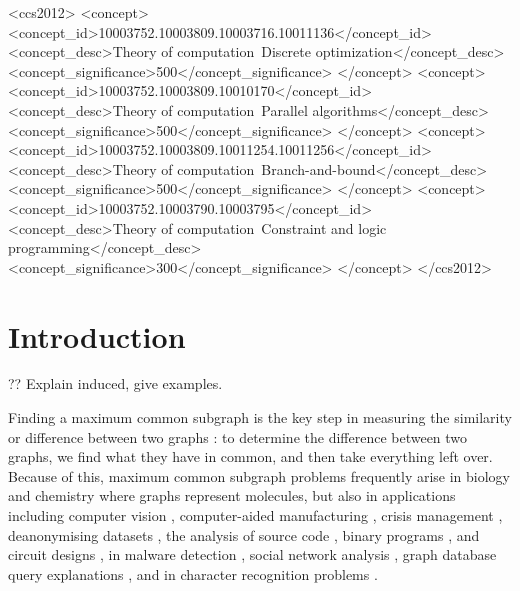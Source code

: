 \documentclass[sigconf]{acmart}
\begin{document}
\begin{CCSXML}
<ccs2012>
<concept>
<concept_id>10003752.10003809.10003716.10011136</concept_id>
<concept_desc>Theory of computation~Discrete optimization</concept_desc>
<concept_significance>500</concept_significance>
</concept>
<concept>
<concept_id>10003752.10003809.10010170</concept_id>
<concept_desc>Theory of computation~Parallel algorithms</concept_desc>
<concept_significance>500</concept_significance>
</concept>
<concept>
<concept_id>10003752.10003809.10011254.10011256</concept_id>
<concept_desc>Theory of computation~Branch-and-bound</concept_desc>
<concept_significance>500</concept_significance>
</concept>
<concept>
<concept_id>10003752.10003790.10003795</concept_id>
<concept_desc>Theory of computation~Constraint and logic programming</concept_desc>
<concept_significance>300</concept_significance>
</concept>
</ccs2012>
\end{CCSXML}



\maketitle

\section{Introduction}

?? Explain induced, give examples.

Finding a maximum common subgraph is the key step in measuring the similarity or difference between
two graphs \citep{DBLP:journals/prl/Bunke97,DBLP:journals/prl/FernandezV01,o:Kriege15}: to determine
the difference between two graphs, we find what they have in common, and then take everything left
over. Because of this, maximum common subgraph problems frequently arise in biology and chemistry
\citep{DBLP:journals/jcamd/RaymondW02a,o:EhrlichR11,DBLP:journals/dam/GayFMSS14} where graphs
represent molecules, but also in applications including computer vision
\citep{DBLP:journals/jair/CookH94,DBLP:conf/gbrpr/CombierDS13}, computer-aided manufacturing
\citep{o:LuoWSN17}, crisis management \citep{o:DelavalladeFLL16}, deanonymising datasets
\citep{o:SharadD13}, the analysis of source code \citep{DBLP:journals/tkde/DjokoCH97}, binary
programs \citep{DBLP:conf/icics/GaoRS08}, and circuit designs \citep{DBLP:journals/jair/CookH94}, in
malware detection \citep{DBLP:journals/compsec/ParkRS13}, social network analysis
\citep{DBLP:journals/tkde/FangYZZ15}, graph database query explanations
\citep{DBLP:journals/jcss/VasilyevaTBL16}, and in character recognition problems
\citep{DBLP:journals/pr/LuRS91}.
\end{document}
